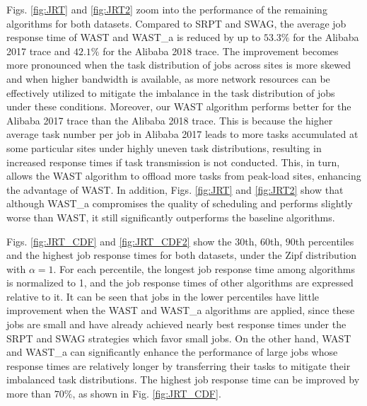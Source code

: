 Figs. \ref{fig:JRT} and \ref{fig:JRT2} zoom into the performance of the remaining algorithms for both datasets. %
Compared to SRPT and SWAG, the average job response time of WAST and WAST\_a is reduced by up to $53.3\%$ for the Alibaba 2017 trace and $42.1\%$ for the Alibaba 2018 trace. The improvement becomes more pronounced when the task distribution of jobs across sites is more skewed and when higher bandwidth is available, as more network resources can be effectively utilized to mitigate the imbalance in the task distribution of jobs under these conditions. Moreover, our WAST algorithm performs better for the Alibaba 2017 trace than the Alibaba 2018 trace. This is because the higher average task number per job in Alibaba 2017 leads to more tasks accumulated at some particular sites under highly uneven task distributions, resulting in increased response times if task transmission is not conducted. This, in turn, allows the WAST algorithm to offload more tasks from peak-load sites, enhancing the advantage of WAST. 
In addition, Figs. \ref{fig:JRT} and \ref{fig:JRT2} show that although WAST\_a compromises the quality of scheduling and performs slightly worse than WAST, it still significantly outperforms the baseline algorithms.%

Figs. \ref{fig:JRT_CDF} and \ref{fig:JRT_CDF2} show the $30$th, $60$th, $90$th percentiles and the highest job response times for both datasets, under the Zipf distribution with $\alpha=1$. For each percentile, the longest job response time among algorithms is normalized to 1, and the job response times of other algorithms are expressed relative to it. It can be seen that jobs in the lower percentiles have little improvement when the WAST and WAST\_a algorithms are applied, since these jobs are small and have already achieved nearly best response times under the SRPT and SWAG strategies which favor small jobs. On the other hand, WAST and WAST\_a can significantly enhance the performance of large jobs whose response times are relatively longer by transferring their tasks to mitigate their imbalanced task distributions. The highest job response time can be improved by more than $70\%$, as shown in Fig. \ref{fig:JRT_CDF}.


